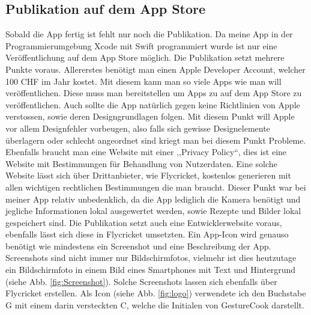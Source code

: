 \documentclass[12pt]{article}
\begin{document}
\subsection{Publikation auf dem App Store}
Sobald die App fertig ist fehlt nur noch die Publikation. Da meine App in der Programmierumgebung Xcode mit Swift programmiert wurde ist nur eine Veröffentlichung auf dem App Store möglich. Die Publikation setzt mehrere Punkte voraus. Allererstes benötigt man einen Apple Developer Account, welcher 100 CHF im Jahr kostet. Mit diesem kann man so viele Apps wie man will veröffentlichen. Diese muss man bereitstellen um Apps zu auf dem App Store zu veröffentlichen. Auch sollte die App natürlich gegen keine Richtlinien von Apple verstossen, sowie deren Designgrundlagen folgen. Mit diesem Punkt will Apple vor allem Designfehler vorbeugen, also falls sich gewisse Designelemente überlagern oder schlecht angeordnet sind kriegt man bei diesem Punkt Probleme. Ebenfalls braucht man eine Website mit einer ,,Privacy Policy``, dies ist eine Website mit Bestimmungen für Behandlung von Nutzerdaten. Eine solche Website lässt sich über Drittanbieter, wie Flycricket, kostenlos generieren mit allen wichtigen rechtlichen Bestimmungen die man braucht. Dieser Punkt war bei meiner App relativ unbedenklich, da die App lediglich die Kamera benötigt und jegliche Informationen lokal ausgewertet werden, sowie Rezepte und Bilder lokal gespeichert sind. Die Publikation setzt auch eine Entwicklerwebsite voraus, ebenfalls lässt sich diese in Flycricket umsetzten. Ein App-Icon wird genauso benötigt wie mindestens ein Screenshot und eine Beschreibung der App. Screenshots sind nicht immer nur Bildschirmfotos, vielmehr ist dies heutzutage ein Bildschirmfoto in einem Bild eines Smartphones mit Text und Hintergrund (siehe Abb. \ref{fig:Screenshot}). Solche Screenshots lassen sich ebenfalls über Flycricket erstellen. Als Icon (siehe Abb. \ref{fig:logo}) verwendete ich den Buchstabe G mit einem darin versteckten C, welche die Initialen von GestureCook darstellt. 
\end{document}
